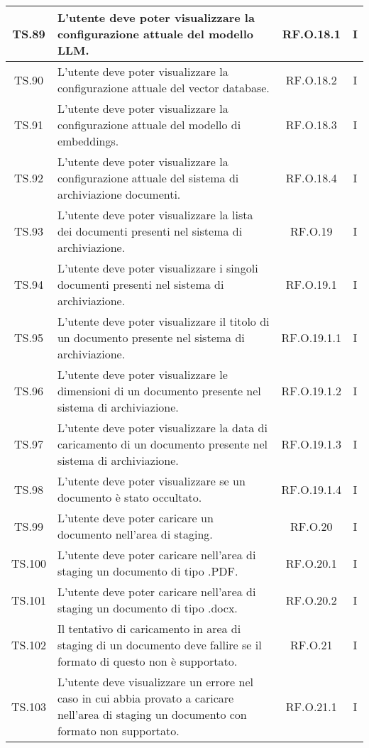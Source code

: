 {{{{{{{{{\begin{xltabular}{\textwidth}{|c|X|c|c|}
    \hline
    TS.89 & L’utente deve poter visualizzare la configurazione attuale del modello LLM. & RF.O.18.1 & I \\
    \hline
    TS.90 & L’utente deve poter visualizzare la configurazione attuale del vector database. & RF.O.18.2 & I \\
    \hline
    TS.91 & L’utente deve poter visualizzare la configurazione attuale del modello di embeddings. & RF.O.18.3 & I \\
    \hline
    TS.92 & L’utente deve poter visualizzare la configurazione attuale del sistema di archiviazione documenti. & RF.O.18.4 & I \\
    \hline
    TS.93 & L’utente deve poter visualizzare la lista dei documenti presenti nel sistema di archiviazione. & RF.O.19 & I \\
    \hline
    TS.94 & L’utente deve poter visualizzare i singoli documenti presenti nel sistema di archiviazione. & RF.O.19.1 & I \\
    \hline
    TS.95 & L’utente deve poter visualizzare il titolo di un documento presente nel sistema di archiviazione. & RF.O.19.1.1 & I \\
    \hline
    TS.96 & L’utente deve poter visualizzare le dimensioni di un documento presente nel sistema di archiviazione. & RF.O.19.1.2 & I \\
    \hline
    TS.97 & L’utente deve poter visualizzare la data di caricamento di un documento presente nel sistema di archiviazione. & RF.O.19.1.3 & I \\
    \hline
    TS.98 & L’utente deve poter visualizzare se un documento è stato occultato. & RF.O.19.1.4 & I \\
    \hline
    TS.99 & L’utente deve poter caricare un documento nell’area di staging. & RF.O.20 & I \\
    \hline
    TS.100 & L’utente deve poter caricare nell’area di staging un documento di tipo .PDF. & RF.O.20.1 & I \\
    \hline
    TS.101 & L’utente deve poter caricare nell’area di staging un documento di tipo .docx. & RF.O.20.2 & I \\
    \hline
    TS.102 & Il tentativo di caricamento in area di staging di un documento deve fallire se il formato di questo non è supportato. & RF.O.21 & I \\
    \hline
    TS.103 & L’utente deve visualizzare un errore nel caso in cui abbia provato a caricare nell’area di staging un documento con formato non supportato. & RF.O.21.1 & I \\

\end{xltabular}}}}}}}}}}
